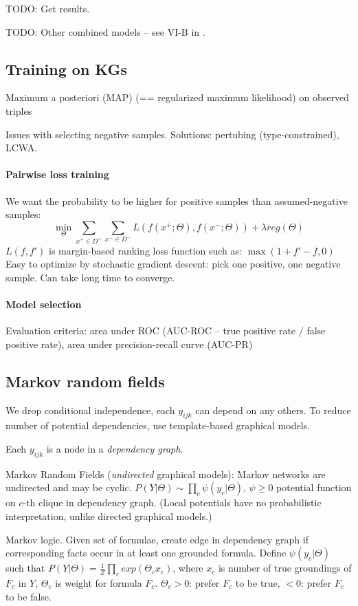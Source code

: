 TODO: Get results.

TODO: Other combined models -- see VI-B in
\cite{review-of-relational-ml-for-kgs}.

\subsection{Training on KGs}

Maximum a posteriori (MAP) (== regularized maximum likelihood) on observed
triples

Issues with selecting negative samples. Solutions: pertubing (type-constrained),
LCWA.

\paragraph{Pairwise loss training}
We want the probability to be higher for positive samples than assumed-negative
samples:
$$\min_\Theta \sum_{x^+\in D^+}\sum_{x^-\in
D^-}L(f(x^+;\Theta),f(x^-;\Theta))+\lambda reg(\Theta)$$
$L(f,f')$ is margin-based ranking loss function such as: $\max(1+f'-f,0)$
Easy to optimize by stochastic gradient descent: pick one positive, one negative
sample. Can take long time to converge.

\paragraph{Model selection} Evaluation criteria: area under ROC (AUC-ROC -- true
positive rate / false positive rate), area under precision-recall curve (AUC-PR)

\subsection{Markov random fields}

We drop conditional independence, each $y_{ijk}$ can depend on any others.
To reduce number of potential dependencies, use template-based graphical models.

Each $y_{ijk}$ is a node in a \textit{dependency graph}.

Markov Random Fields (\textit{undirected} graphical models):
Markov networks are undirected and may be cyclic.
$P(Y|\Theta) \sim \prod_c \psi(y_c|\Theta)$, $\psi\geq 0$ potential
function on $c$-th clique in dependency graph. (Local potentials have no
probabilistic interpretation, unlike directed graphical models.)

Markov logic. Given set of formulae, create edge in dependency graph if
corresponding facts occur in at least one grounded formula.
Define $\psi(y_c|\Theta)$ such that $P(Y|\Theta)=\frac{1}{Z}\prod_c
exp(\Theta_c x_c)$, where $x_c$ is number of true groundings of $F_c$ in $Y$,
$\Theta_c$ is weight for formula $F_c$. $\Theta_c>0$: prefer $F_c$ to be true,
$<0$: prefer $F_c$ to be false.

